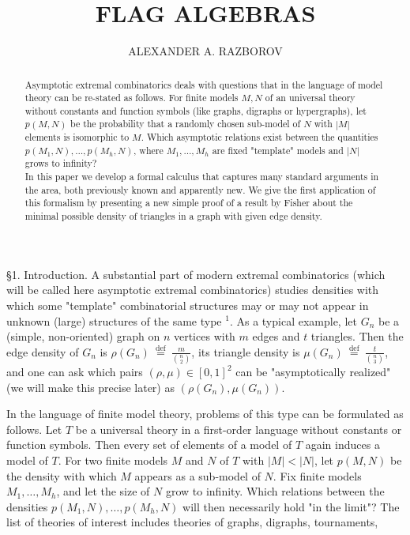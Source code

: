 \documentclass[10pt]{article}
\title{FLAG ALGEBRAS }
\author{ALEXANDER A. RAZBOROV}
\date{}
\begin{document}
\maketitle
\captionsetup{singlelinecheck=false}


\begin{abstract}
Asymptotic extremal combinatorics deals with questions that in the language of model theory can be re-stated as follows. For finite models $M, N$ of an universal theory without constants and function symbols (like graphs, digraphs or hypergraphs), let $p(M, N)$ be the probability that a randomly chosen sub-model of $N$ with $|M|$ elements is isomorphic to $M$. Which asymptotic relations exist between the quantities $p\left(M_{1}, N\right), \ldots, p\left(M_{h}, N\right)$, where $M_{1}, \ldots, M_{h}$ are fixed "template" models and $|N|$ grows to infinity?\\
In this paper we develop a formal calculus that captures many standard arguments in the area, both previously known and apparently new. We give the first application of this formalism by presenting a new simple proof of a result by Fisher about the minimal possible density of triangles in a graph with given edge density.
\end{abstract}

§1. Introduction. A substantial part of modern extremal combinatorics (which will be called here asymptotic extremal combinatorics) studies densities with which some "template" combinatorial structures may or may not appear in unknown (large) structures of the same type ${ }^{1}$. As a typical example, let $G_{n}$ be a (simple, non-oriented) graph on $n$ vertices with $m$ edges and $t$ triangles. Then the edge density of $G_{n}$ is $\rho\left(G_{n}\right) \stackrel{\text { def }}{=} \frac{m}{\binom{n}{2}}$, its triangle density is $\mu\left(G_{n}\right) \stackrel{\text { def }}{=} \frac{t}{\binom{n}{3}}$, and one can ask which pairs $(\rho, \mu) \in[0,1]^{2}$ can be "asymptotically realized" (we will make this precise later) as $\left(\rho\left(G_{n}\right), \mu\left(G_{n}\right)\right)$.

In the language of finite model theory, problems of this type can be formulated as follows. Let $T$ be a universal theory in a first-order language without constants or function symbols. Then every set of elements of a model of $T$ again induces a model of $T$. For two finite models $M$ and $N$ of $T$ with $|M|<|N|$, let $p(M, N)$ be the density with which $M$ appears as a sub-model of $N$. Fix finite models $M_{1}, \ldots, M_{h}$, and let the size of $N$ grow to infinity. Which relations between the densities $p\left(M_{1}, N\right), \ldots, p\left(M_{h}, N\right)$ will then necessarily hold "in the limit"? The list of theories of interest includes theories of graphs, digraphs, tournaments,
\end{document}
